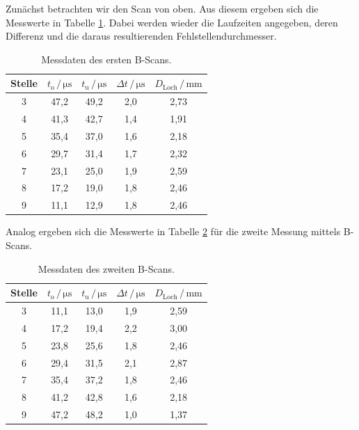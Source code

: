 Zunächst betrachten wir den Scan von oben. Aus diesem ergeben sich die Messwerte in Tabelle \ref{tab:mess3}.
Dabei werden wieder die Laufzeiten angegeben, deren Differenz und die daraus resultierenden 
Fehlstellendurchmesser.  

\begin{table}
\centering
\caption{Messdaten des ersten B-Scans.}
\label{tab:mess3}
\begin{tabular}{c c c c c}
\toprule
Stelle & $t_\text{o} \,/\, \si{\micro\second}$ & $t_\text{u} \,/\, \si{\micro\second}$ &$\Delta t \,/\, \si{\micro\second}$ & $D_\text{Loch} \,/\, \si{\milli\meter}$\\
\midrule 
3 & 47,2 & 49,2 & 2,0 & 2,73\\
4 & 41,3 & 42,7 & 1,4 & 1,91\\
5 & 35,4 & 37,0 & 1,6 & 2,18\\
6 & 29,7 & 31,4 & 1,7 & 2,32\\
7 & 23,1 & 25,0 & 1,9 & 2,59\\
8 & 17,2 & 19,0 & 1,8 & 2,46\\
9 & 11,1 & 12,9 & 1,8 & 2,46\\
\bottomrule
\end{tabular}
\end{table}

Analog ergeben sich die Messwerte in Tabelle \ref{tab:mess4} für die zweite Messung mittels B-Scans.

\begin{table}
\centering
\caption{Messdaten des zweiten B-Scans.}
\label{tab:mess4}
\begin{tabular}{c c c c c}
\toprule
Stelle & $t_\text{o} \,/\, \si{\micro\second}$ & $t_\text{u} \,/\, \si{\micro\second}$ &$\Delta t \,/\, \si{\micro\second}$ & $D_\text{Loch} \,/\, \si{\milli\meter}$\\
\midrule 
3 & 11,1 & 13,0 & 1,9 & 2,59\\
4 & 17,2 & 19,4 & 2,2 & 3,00\\
5 & 23,8 & 25,6 & 1,8 & 2,46\\
6 & 29,4 & 31,5 & 2,1 & 2,87\\
7 & 35,4 & 37,2 & 1,8 & 2,46\\
8 & 41,2 & 42,8 & 1,6 & 2,18\\
9 & 47,2 & 48,2 & 1,0 & 1,37\\
\bottomrule
\end{tabular}
\end{table}

